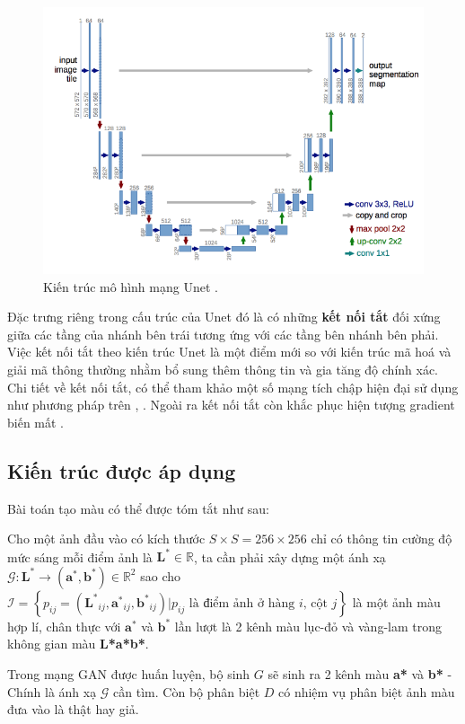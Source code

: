 \documentclass[a4paper, 12pt]{article}
\begin{document}
\begin{figure}[!h]
\captionsetup{width=0.8\textwidth}
\centering
\includegraphics[width=15cm]{images/2_8.png}
\caption{Kiến trúc mô hình mạng Unet \cite{ronneberger2015unet}.}
\end{figure}

\noindent
Đặc trưng riêng trong cấu trúc của Unet đó là có những \textbf{kết nối tắt} đối xứng giữa các tầng của nhánh bên trái tương ứng với các tầng bên nhánh bên phải. Việc kết nối tắt theo kiến trúc Unet là một điểm mới so với kiến trúc mã hoá và giải mã thông thường nhằm bổ sung thêm thông tin và gia tăng độ chính xác. Chi tiết về kết nối tắt, có thể tham khảo một số mạng tích chập hiện đại sử dụng như phương pháp trên \cite{he2015deep}, \cite{huang2018densely}. Ngoài ra kết nối tắt còn khắc phục hiện tượng gradient biến mất \cite{adaloglou2020skip}.

\subsection{Kiến trúc được áp dụng}
Bài toán tạo màu có thể được tóm tắt như sau:
\begin{tcolorbox}
Cho một ảnh đầu vào có kích thước $S\times S = 256\times 256$ chỉ có thông tin cường độ mức sáng mỗi điểm ảnh là $\mathbf{L^*} \in \mathbb{R}$, ta cần phải xây dựng một ánh xạ $\mathcal{G}: \mathbf{L^*} \rightarrow \left(\mathbf{a^*}, \mathbf{b^*}\right) \in \mathbb{R}^2$ sao cho $\mathcal{I} = \left\{p_{ij} = \left(\mathbf{L^*}_{ij}, \mathbf{a^*}_{ij}, \mathbf{b^*}_{ij}\right)\vert p_{ij} \text{ là điểm ảnh ở hàng } i \text{, cột } j\right\}$ là một ảnh màu hợp lí, chân thực với $\mathbf{a^*}$ và $\mathbf{b^*}$ lần lượt là 2 kênh màu lục-đỏ và vàng-lam trong không gian màu \textbf{L*a*b*}.
\end{tcolorbox}
\noindent
Trong mạng GAN được huấn luyện, bộ sinh $G$ sẽ sinh ra 2 kênh màu \textbf{a*} và \textbf{b*} - Chính là ánh xạ $\mathcal{G}$ cần tìm. Còn bộ phân biệt $D$ có nhiệm vụ phân biệt ảnh màu đưa vào là thật hay giả.
\end{document}
